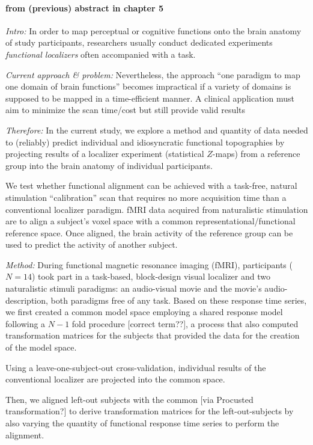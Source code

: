 \paragraph{from (previous) abstract in chapter 5}
\textit{Intro:} In order to map perceptual or cognitive functions onto the brain
anatomy of study participants, researchers usually conduct dedicated experiments
\textit{functional localizers} often accompanied with a task.

\textit{Current approach \& problem:} Nevertheless, the approach ``one paradigm
to map one domain of brain functions'' becomes impractical if a variety of
domains is supposed to be mapped in a time-efficient manner.
%
A clinical application must aim to minimize the scan time/cost but still provide
valid results

\textit{Therefore:} In the current study, we explore a method and quantity of
data needed to (reliably) predict individual and idiosyncratic functional
topographies by projecting results of a localizer experiment (statistical
$Z$-maps) from a reference group into the brain anatomy of individual
participants.

%
We test whether functional alignment can be achieved with a task-free, natural
stimulation ``calibration'' scan that requires no more acquisition time than a
conventional localizer paradigm.
%
fMRI data acquired from naturalistic stimulation are to align a subject's voxel
space with a common representational/functional reference space.
%
Once aligned, the brain activity of the reference group can be used to predict
the activity of another subject.


\textit{Method:}
During functional magnetic resonance imaging (fMRI), participants ($N=14$) took
part in a task-based, block-design visual localizer and two naturalistic stimuli
paradigms: an audio-visual movie and the movie's audio-description, both
paradigms free of any task.
Based on these response time series, we first created a common model space
employing a shared response model \citep{chen2015reduced} following a $N-1$ fold
procedure [correct term??], a process that also computed transformation matrices
for the subjects that provided the data for the creation of the model space.

%
Using a leave-one-subject-out cross-validation, individual results of the
conventional localizer are projected into the common space.

Then, we aligned left-out subjects with the common [via Procusted
transformation?] to derive transformation matrices for the left-out-subjects by
also varying the quantity of functional response time series to perform the
alignment.

